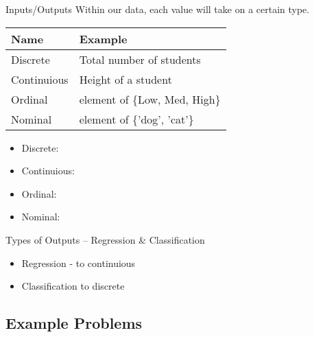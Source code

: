 \documentclass[10pt]{beamer}
\begin{document}
\begin{frame}[label={sec:org1f0c166}]{Inputs/Outputs}
Within our data, each value will take on a certain type.

\begin{center}
\begin{tabular}{ll}
Name & Example\\
\hline
Discrete & Total number of students\\
Continuious & Height of a student\\
\hline
Ordinal & element of \{Low, Med, High\}\\
Nominal & element of \{'dog', 'cat'\}\\
\end{tabular}
\end{center}

\begin{itemize}
\item Discrete:
\item Continuious:
\item Ordinal:
\item Nominal:
\end{itemize}
\end{frame}

\begin{frame}[label={sec:org36c274e}]{Types of Outputs -- Regression \& Classification}
\begin{itemize}
\item Regression - to continuious
\item Classification to discrete
\end{itemize}
\end{frame}

\subsection*{Example Problems}
\label{sec:org90a8201}
\end{document}
